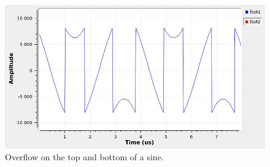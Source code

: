 \documentclass[12pt,oneside]{article}
\begin{document}
\begin{figure}[h!tb]
\begin{center}
\includegraphics[width=0.5\linewidth]{figures/overflow.jpg}
\caption{Overflow on the top and bottom of a sine.}
\label{fig:overflow}
\end{center}
\end{figure}

\newpage 
\vspace*{-1.7cm}
\hspace*{-1cm}
\end{document}
